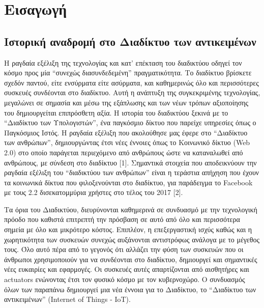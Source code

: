 \setlength{\parindent}{24pt}
\chapter{Εισαγωγή} %

\label{Chapter1} %



\section{Ιστορική αναδρομή στο Διαδίκτυο των αντικειμένων}
Η ραγδαία εξέλιξη της τεχνολογίας και κατ’ επέκταση του διαδικτύου οδηγεί τον κόσμο προς μία “συνεχώς διασυνδεδεμένη” πραγματι­κότητα.  Το διαδίκτυο βρίσκετε σχεδόν παντού, είτε ενσύρματα είτε ασύρματα, και καθημερινώς όλο και περισσότερες συσκευές συνδέονται στο διαδίκτυο. Αυτή η ανάπτυξη της συγκεκριμένης τεχνολογίας, μεγα­λώνει σε σημασία και μέσω της εξάπλωσης και των νέων τρόπων αξιοποίη­σης του δημιουργείται επιπρόσθετη αξία. Η ιστορία του διαδικτύ­ου ξεκινά με το “Διαδίκτυο των Υπολογιστών”, ένα παγκόσμιο δίκτυο που παρείχε υπηρεσίες όπως ο Παγκόσμιος Ιστός. Η ραγδαία εξέλιξη που ακο­λούθησε μας έφερε στο “Διαδίκτυο των ανθρώπων”, δημιουργώντας έτσι νέες έννοιες όπως το Κοινωνικό δίκτυο (Web 2.0) στο οποίο παράγεται περιεχόμενο από ανθρώπους ώστε να καταναλωθεί από ανθρώπους, με σύνδεση στο διαδίκτυο [1]. Σημαντικά στοιχεία που αποδεικνύουν την ρα­γδαία εξέλιξη του “διαδικτύου των ανθρώπων” είναι η τεράστια απήχηση που έχουν τα κοινωνικά δίκτυα που φιλοξενούνται στο διαδίκτυο, για παράδειγμα το Facebook με τους 2.2 δισεκατομμύρια χρήστες στο τέλος του 2017 [2]. 

Τα όρια του Διαδικτύου, διευρύνονται καθημερινά σε συνδυασμό με την τεχνολογική πρόοδο που καθιστά επιτρεπτή την πρόσβαση σε αυτό από όλο και περισσότερα σημεία με όλο και μικρότερο κόστος. Επιπλέον, η επεξεργαστική ισχύς καθώς και η χωρητικότητα των συσκευών συνε­χώς αυξάνονται αντιστρόφως ανάλογα με το μέγεθος τους. Όλο αυτό πέρα από το γεγονός ότι αλλάζει την φύση των συσκευών που οι άνθρω­ποι χρησιμοποιούν για να συνδέονται στο διαδίκτυο, δημιουργεί και σημα­ντικές νέες ευκαιρίες και εφαρμογές. Οι συσκευές αυτές απαρτίζονται από αισθητήρες και actuators ενώνοντας έτσι τον φυσικό κόσμο με τον κυβερνοχώρο. Ο συνδυασμός όλων των παραπάνω δημιουργεί μια νέα έν­νοια για το Διαδίκτυο, το “Διαδίκτυο των αντικειμένων” (Internet of Things - IoT). 

